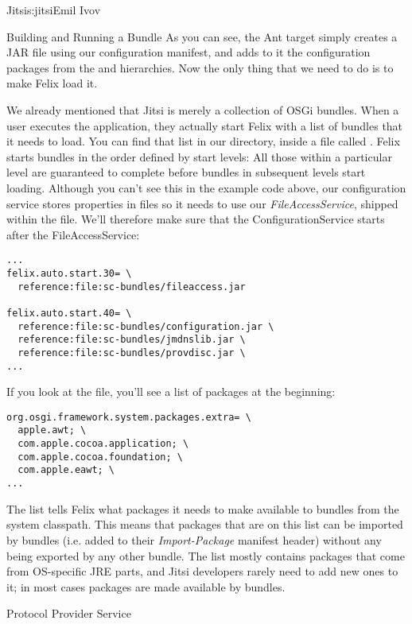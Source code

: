 \begin{aosachapter}{Jitsi}{s:jitsi}{Emil Ivov}
\begin{aosasect1}{Building and Running a Bundle}
As you can see, the Ant target simply creates a JAR file using our
configuration manifest, and adds to it the configuration packages from
the  and  hierarchies. Now the only thing
that we need to do is to make Felix load it.

We already mentioned that Jitsi is merely a collection of OSGi
bundles. When a user executes the application, they actually start
Felix with a list of bundles that it needs to load.  You can find that
list in our  directory, inside a file called
. Felix starts bundles in the order
defined by start levels: All those within a particular level are
guaranteed to complete before bundles in subsequent levels start
loading. Although you can't see this in the example code above, our
configuration service stores properties in files so it needs to use
our \emph{FileAccessService}, shipped within the 
file. We'll therefore make sure that the ConfigurationService starts
after the FileAccessService:

\begin{verbatim}
...
felix.auto.start.30= \
  reference:file:sc-bundles/fileaccess.jar

felix.auto.start.40= \
  reference:file:sc-bundles/configuration.jar \
  reference:file:sc-bundles/jmdnslib.jar \
  reference:file:sc-bundles/provdisc.jar \
...
\end{verbatim}

If you look at the  file, you'll see
a list of packages at the beginning:

\begin{verbatim}
org.osgi.framework.system.packages.extra= \
  apple.awt; \
  com.apple.cocoa.application; \
  com.apple.cocoa.foundation; \
  com.apple.eawt; \
...
\end{verbatim}

\noindent The list tells Felix what packages it needs to make available to
bundles from the system classpath. This means that packages that are
on this list can be imported by bundles (i.e. added to their
\emph{Import-Package} manifest header) without any being exported by
any other bundle. The list mostly contains packages that come from
OS-specific JRE parts, and Jitsi developers rarely need to add new
ones to it; in most cases packages are made available by bundles.

\end{aosasect1}

\begin{aosasect1}{Protocol Provider Service}


\end{aosasect1}
\end{aosachapter}
